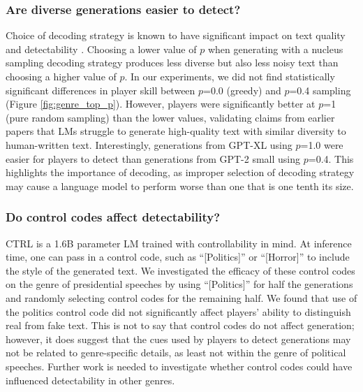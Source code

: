 \subsubsection{Are diverse generations easier to detect?}
Choice of decoding strategy is known to have significant impact on text quality \citep{zhang2021trading} and detectability \citep{ippolito2020automatic}.
Choosing a lower value of $p$ when generating with a nucleus sampling \citep{holtzman2019curious} decoding strategy produces less diverse but also less noisy text than choosing a higher value of $p$.
In our experiments, we did not find statistically significant differences in player skill between $p$=0.0 (greedy) and $p$=0.4 sampling (Figure \ref{fig:genre_top_p}).
However, players were significantly better at $p$=1 (pure random sampling) than the lower values, 
validating claims from earlier papers that LMs struggle to generate high-quality text with similar diversity to human-written text.
Interestingly, generations from GPT-XL using $p$=1.0 were easier for players to detect than generations from GPT-2 small using $p$=0.4.
This highlights the importance of decoding, as improper selection of decoding strategy may cause a language model to perform worse than one that is one tenth its size.


\subsubsection{Do control codes affect detectability?}
CTRL is a 1.6B parameter LM trained with controllability in mind.
At inference time, one can pass in a control code, such as ``[Politics]'' or ``[Horror]'' to include the style of the generated text.
We investigated the efficacy of these control codes on the genre of presidential speeches by using ``[Politics]'' for half the generations and randomly selecting control codes for the remaining half.
We found that use of the politics control code did not significantly affect  players' ability to distinguish real from fake text.
This is not to say that control codes do not affect generation; however, it does suggest that the cues used by players to detect generations may not be related to genre-specific details, as least not within the genre of political speeches.
Further work is needed to investigate whether control codes could have influenced detectability in other genres.

